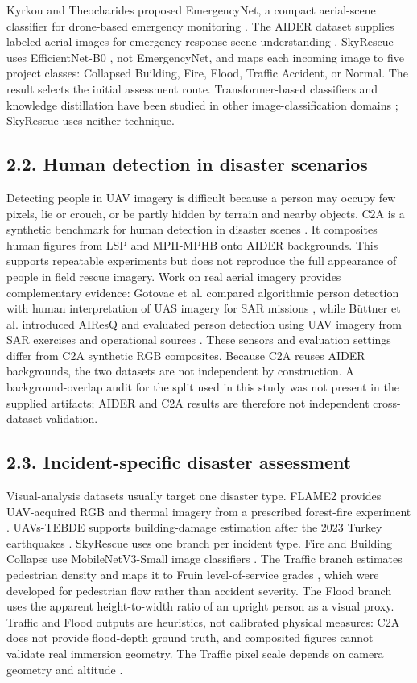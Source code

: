 \documentclass[pdflatex,sn-mathphys-ay]{sn-jnl}
\begin{document}
Kyrkou and Theocharides proposed EmergencyNet, a compact aerial-scene classifier for drone-based emergency monitoring \cite{ref03}. The AIDER dataset supplies labeled aerial images for emergency-response scene understanding \cite{ref04}. SkyRescue uses EfficientNet-B0 \cite{ref05}, not EmergencyNet, and maps each incoming image to five project classes: Collapsed Building, Fire, Flood, Traffic Accident, or Normal. The result selects the initial assessment route. Transformer-based classifiers and knowledge distillation have been studied in other image-classification domains \cite{ref27}; SkyRescue uses neither technique.

\subsection*{2.2. Human detection in disaster scenarios}

Detecting people in UAV imagery is difficult because a person may occupy few pixels, lie or crouch, or be partly hidden by terrain and nearby objects. C2A is a synthetic benchmark for human detection in disaster scenes \cite{ref06}. It composites human figures from LSP and MPII-MPHB onto AIDER backgrounds. This supports repeatable experiments but does not reproduce the full appearance of people in field rescue imagery. Work on real aerial imagery provides complementary evidence: Gotovac et al. compared algorithmic person detection with human interpretation of UAS imagery for SAR missions \cite{ref07}, while Büttner et al. introduced AIResQ and evaluated person detection using UAV imagery from SAR exercises and operational sources \cite{ref08}. These sensors and evaluation settings differ from C2A synthetic RGB composites. Because C2A reuses AIDER backgrounds, the two datasets are not independent by construction. A background-overlap audit for the split used in this study was not present in the supplied artifacts; AIDER and C2A results are therefore not independent cross-dataset validation.

\subsection*{2.3. Incident-specific disaster assessment}

Visual-analysis datasets usually target one disaster type. FLAME2 provides UAV-acquired RGB and thermal imagery from a prescribed forest-fire experiment \cite{ref09}. UAVs-TEBDE supports building-damage estimation after the 2023 Turkey earthquakes \cite{ref10}. SkyRescue uses one branch per incident type. Fire and Building Collapse use MobileNetV3-Small image classifiers \cite{ref11}. The Traffic branch estimates pedestrian density and maps it to Fruin level-of-service grades \cite{ref12}, which were developed for pedestrian flow rather than accident severity. The Flood branch uses the apparent height-to-width ratio of an upright person as a visual proxy. Traffic and Flood outputs are heuristics, not calibrated physical measures: C2A does not provide flood-depth ground truth, and composited figures cannot validate real immersion geometry. The Traffic pixel scale depends on camera geometry and altitude \cite{ref23}.
\end{document}
